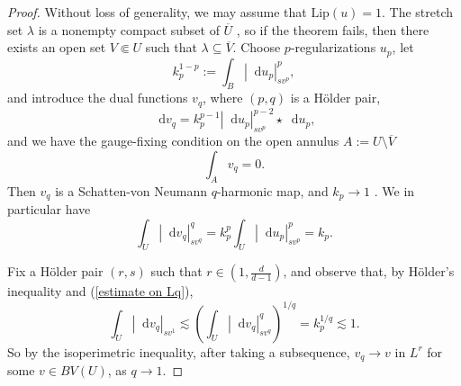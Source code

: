 \documentclass[reqno,11pt]{amsart}
\newcommand*\dif{\mathop{}\!\mathrm{d}}
\newcommand{\Lip}{\mathrm{Lip}}
\newcommand{\cpt}{\mathrm{cpt}}
\newtheorem{lemma}[theorem]{Lemma}
\theoremstyle{definition}
\numberwithin{equation}{section}
\begin{document}
\begin{proof}
Without loss of generality, we may assume that $\Lip(u) = 1$.
The stretch set $\lambda$ is a nonempty compact subset of $\overline U$ \cite[Lemma 4.2]{Crandall2008}, so if the theorem fails, then there exists an open set $V \Subset U$ such that $\lambda \subseteq \overline V$.
Choose $p$-regularizations $u_p$, let
$$k_p^{1 - p} := \int_B |\dif u_p|_{sv^p}^p,$$
and introduce the dual functions $v_q$, where $(p, q)$ is a H\"older pair,
$$\dif v_q = k_p^{p - 1} |\dif u_p|_{sv^p}^{p - 2} \star \dif u_p,$$
and we have the gauge-fixing condition on the open annulus $A := U \setminus \overline V$
\begin{equation}\label{annulus average is 0}
\int_A v_q = 0.
\end{equation}
Then $v_q$ is a Schatten-von Neumann $q$-harmonic map, and $k_p \to 1$ \cite[\S3]{daskalopoulos2022transverse}.
We in particular have 
\begin{equation}\label{estimate on Lq}
\int_U |\dif v_q|_{sv^q}^q = k_p^p \int_U |\dif u_p|_{sv^p}^p = k_p.
\end{equation}

Fix a H\"older pair $(r, s)$ such that $r \in (1, \frac{d}{d - 1})$, and observe that, by H\"older's inequality and (\ref{estimate on Lq}),
$$\int_U |\dif v_q|_{sv^1} \lesssim \left(\int_U |\dif v_q|_{sv^q}^q\right)^{1/q} = k_p^{1/q} \lesssim 1.$$
So by the isoperimetric inequality, after taking a subsequence, $v_q \to v$ in $L^r$ for some $v \in BV(U)$, as $q \to 1$.



\end{proof}
\end{document}
